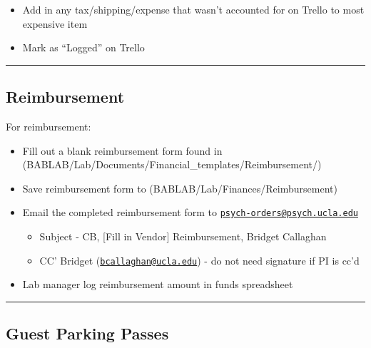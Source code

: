 \documentclass[
]{book}
\providecommand{\tightlist}{%
  \setlength{\itemsep}{0pt}\setlength{\parskip}{0pt}}
\begin{document}
\begin{itemize}
  \begin{itemize}
  \tightlist
  \item
    Add in any tax/shipping/expense that wasn't accounted for on Trello to most expensive item
  \item
    Mark as ``Logged'' on Trello
  \end{itemize}
\end{itemize}

\begin{center}\rule{0.5\linewidth}{0.5pt}\end{center}

\hypertarget{reimbursement}{%
\subsection{Reimbursement}\label{reimbursement}}

For reimbursement:

\begin{itemize}
\tightlist
\item
  Fill out a blank reimbursement form found in (BABLAB/Lab/Documents/Financial\_templates/Reimbursement/)
\item
  Save reimbursement form to (BABLAB/Lab/Finances/Reimbursement)
\item
  Email the completed reimbursement form to \href{mailto:psych-orders@psych.ucla.edu}{\nolinkurl{psych-orders@psych.ucla.edu}}

  \begin{itemize}
  \tightlist
  \item
    Subject - CB, {[}Fill in Vendor{]} Reimbursement, Bridget Callaghan
  \item
    CC' Bridget (\href{mailto:bcallaghan@ucla.edu}{\nolinkurl{bcallaghan@ucla.edu}}) - do not need signature if PI is cc'd
  \end{itemize}
\item
  Lab manager log reimbursement amount in funds spreadsheet
\end{itemize}

\begin{center}\rule{0.5\linewidth}{0.5pt}\end{center}

\hypertarget{guest-parking-passes}{%
\subsection{Guest Parking Passes}\label{guest-parking-passes}}
\end{document}
